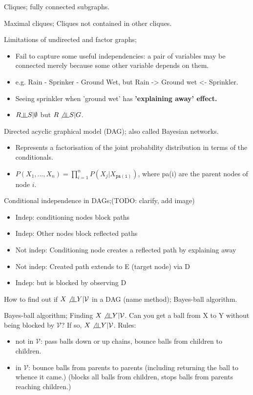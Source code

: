 \documentclass{article}
\newcommand{\indep}{\rotatebox[origin=c]{90}{$\models$}}
\begin{document}
Cliques; fully connected subgraphs.

Maximal cliques; Cliques not contained in other cliques.

Limitations of undirected and factor graphs; \begin{itemize} \item Fail to capture some useful independencies: a pair of variables may be connected merely because some other variable depends on them.  \item e.g. Rain - Sprinker - Ground Wet, but Rain -> Ground wet <- Sprinkler.  \item Seeing sprinkler when 'ground wet' has \bf{'explaining away'} effect.  \item $R \indep S|\emptyset$ but $R \not\indep S | G$.  \end{itemize}

Directed acyclic graphical model (DAG); also called Bayesian networks. \begin{itemize} \item Represents a factorisation of the joint probability distribution in terms of the conditionals.  \item $P(X_1,...,X_n)=\prod_{i=1}^n P(X_j|X_\mathtt{pa(i)})$, where pa(i) are the parent nodes of node $i$.  \end{itemize}

Conditional independence in DAGs;(TODO: clarify, add image) \begin{itemize} \item Indep: conditioning nodes block paths \item Indep: Other nodes block reflected paths \item Not indep: Conditioning node creates a reflected path by explaining away \item Not indep: Created path extends to E (target node) via D \item Indep: but is blocked by observing D \end{itemize}

How to find out if $X \not \indep Y | \mathcal{V}$ in a DAG (name method); Bayes-ball algorithm.

Bayes-ball algorithm; Finding $X \not \indep Y | \mathcal{V}$. \newline Can you get a ball from X to Y without being blocked by $\mathcal{V}$? If so, $X \not \indep Y | \mathcal{V}$. Rules: \begin{itemize} \item not in $\mathcal{V}$: pass balls down or up chains, bounce balls from children to children.  \item in $\mathcal{V}$: bounce balls from parents to parents (including returning the ball to whence it came.) (blocks all balls from children, stops balls from parents reaching children.) \end{itemize}
\end{document}
